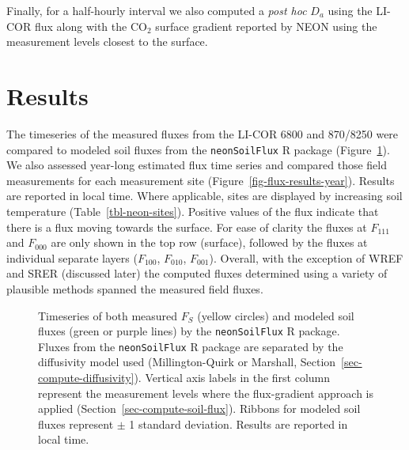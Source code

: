 \documentclass[
  letterpaper,
  DIV=11,
  numbers=noendperiod]{scrartcl}
\begin{document}
Finally, for a half-hourly interval we also computed a \emph{post hoc}
\(D_{a}\) using the LI-COR flux along with the CO\(_{2}\) surface
gradient reported by NEON using the measurement levels closest to the
surface.

\section{Results}\label{results}

The timeseries of the measured fluxes from the LI-COR 6800 and 870/8250
were compared to modeled soil fluxes from the \texttt{neonSoilFlux} R
package (Figure~\ref{fig-flux-results}). We also assessed year-long
estimated flux time series and compared those field measurements for
each measurement site (Figure~\ref{fig-flux-results-year}). Results are
reported in local time. Where applicable, sites are displayed by
increasing soil temperature (Table~\ref{tbl-neon-sites}). Positive
values of the flux indicate that there is a flux moving towards the
surface. For ease of clarity the fluxes at \(F_{111}\) and \(F_{000}\)
are only shown in the top row (surface), followed by the fluxes at
individual separate layers (\(F_{100}\), \(F_{010}\), \(F_{001}\)).
Overall, with the exception of WREF and SRER (discussed later) the
computed fluxes determined using a variety of plausible methods spanned
the measured field fluxes.

\begin{figure}


\caption{\label{fig-flux-results}Timeseries of both measured \(F_{S}\)
(yellow circles) and modeled soil fluxes (green or purple lines) by the
\texttt{neonSoilFlux} R package. Fluxes from the \texttt{neonSoilFlux} R
package are separated by the diffusivity model used (Millington-Quirk or
Marshall, Section~\ref{sec-compute-diffusivity}). Vertical axis labels
in the first column represent the measurement levels where the
flux-gradient approach is applied (Section~\ref{sec-compute-soil-flux}).
Ribbons for modeled soil fluxes represent \(\pm\) 1 standard deviation.
Results are reported in local time.}

\end{figure}%
\end{document}
